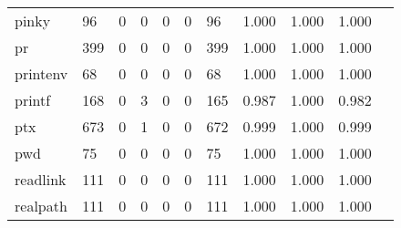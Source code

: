 \begin{longtable}{lp{1.10cm}p{1.10cm}p{1.10cm}p{1.10cm}p{1.10cm}p{1.10cm}p{1.10cm}p{1.10cm}p{1.10cm}p{1.10cm}}
pinky     &                     96 &                                  0 &                                 0 &                                0 &                                 0 &                              96 &                          1.000 &                                 1.000 &                               1.000 \\
pr        &                    399 &                                  0 &                                 0 &                                0 &                                 0 &                             399 &                          1.000 &                                 1.000 &                               1.000 \\
printenv  &                     68 &                                  0 &                                 0 &                                0 &                                 0 &                              68 &                          1.000 &                                 1.000 &                               1.000 \\
printf    &                    168 &                                  0 &                                 3 &                                0 &                                 0 &                             165 &                          0.987 &                                 1.000 &                               0.982 \\
ptx       &                    673 &                                  0 &                                 1 &                                0 &                                 0 &                             672 &                          0.999 &                                 1.000 &                               0.999 \\
pwd       &                     75 &                                  0 &                                 0 &                                0 &                                 0 &                              75 &                          1.000 &                                 1.000 &                               1.000 \\
readlink  &                    111 &                                  0 &                                 0 &                                0 &                                 0 &                             111 &                          1.000 &                                 1.000 &                               1.000 \\
realpath  &                    111 &                                  0 &                                 0 &                                0 &                                 0 &                             111 &                          1.000 &                                 1.000 &                               1.000 \\

\end{longtable}
